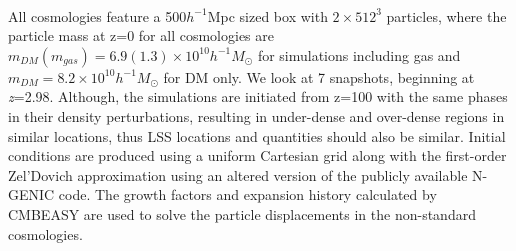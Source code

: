 \documentclass[a4paper,fleqn,usenatbib]{mnras}
\begin{document}
\\
All cosmologies feature a 500$h^{-1}$Mpc sized box with $2 \times 512^{3}$ particles, where the particle mass at z=0 for all cosmologies are $m_{DM}(m_{gas})=6.9(1.3)\times 10^{10}h^{-1}M_{\odot}$ for simulations including gas and $m_{DM}=8.2\times 10^{10}h^{-1}M_{\odot}$ for DM only. We look at 7 snapshots, beginning at \textit{z}=2.98. Although, the simulations are initiated from z=100 with the same phases in their density perturbations, resulting in under-dense and over-dense regions in similar locations, thus LSS locations and quantities should also be similar. Initial conditions are produced using a uniform Cartesian grid along with the first-order Zel'Dovich approximation using an altered version of the publicly available N-GENIC code. The growth factors and expansion history calculated by CMBEASY are used to solve the particle displacements in the non-standard cosmologies. 
\end{document}
